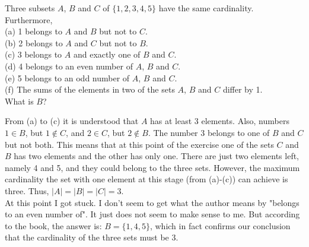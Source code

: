 \documentclass[12pt]{article}
\newenvironment{problem}[2][Problem]{\begin{trivlist}
		\item[\hskip \labelsep {\bfseries #1}\hskip \labelsep {\bfseries #2.}]}{\end{trivlist}}
\newenvironment{solution}[2][Solution]{\begin{trivlist}
		\item[\hskip \labelsep {\bfseries #1}\hskip \labelsep {\bfseries #2.}]}{\end{trivlist}}
\begin{document}
\begin{problem}{21}
	Three subsets $A$, $B$ and $C$ of $\{1,2,3,4,5\}$ have the same cardinality. Furthermore, \\
	(a) 1 belongs to $A$ and $B$ but not to $C$.\\
	(b) 2 belongs to $A$ and $C$ but not to $B$.\\
	(c) 3 belongs to $A$ and exactly one of $B$ and $C$.\\
	(d) 4 belongs to an even number of $A$, $B$ and $C$.\\
	(e) 5 belongs to an odd number of $A$, $B$ and $C$.\\
	(f) The sums of the elements in two of the sets $A$, $B$ and $C$ differ by 1.\\
	
	What is $B$? 
	\begin{solution}{}
		From (a) to (c) it is understood that $A$ has at least 3 elements. Also, numbers $1\in B$, but $1\notin C$, and $2\in C$, but $2\notin B$. The number $3$ belongs to one of $B$ and $C$ but not both. This means that at this point of the exercise one of the sets $C$ and $B$ has two elements and the other has only one. There are just two elements left, namely 4 and 5, and they could belong to the three sets. However, the maximum cardinality the set with one element at this stage (from (a)-(c)) can achieve is three. Thus, $|A|=|B|=|C|=3.$\\
		At this point I got stuck. I don't seem to get what the author means by "belongs to an even number of". It just does not seem to make sense to me. But according to the book, the answer is: $B=\{1,4,5\}$, which in fact confirms our conclusion that the cardinality of the three sets must be 3.
	\end{solution}
\end{problem}
\end{document}

